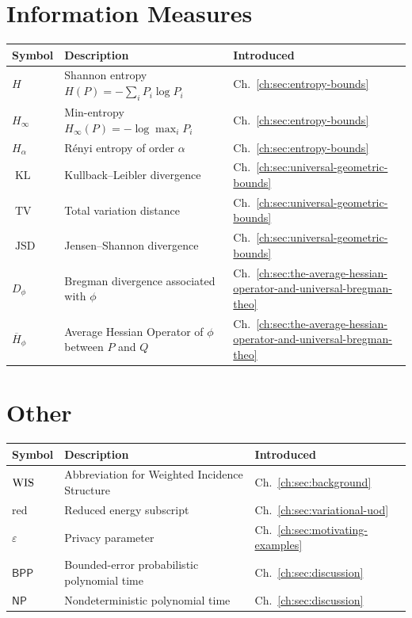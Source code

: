 \section*{Information Measures}

\begin{center}
\begin{tabular}{lll}
\hline
\textbf{Symbol} & \textbf{Description} & \textbf{Introduced} \\
\hline
  $H$ & Shannon entropy $H(P)=-\sum_i P_i\log P_i$ & Ch.~\ref{ch:sec:entropy-bounds} \\
  $H_\infty$ & Min-entropy $H_\infty(P)=-\log\max_i P_i$ & Ch.~\ref{ch:sec:entropy-bounds} \\
  $H_\alpha$ & R\'enyi entropy of order $\alpha$ & Ch.~\ref{ch:sec:entropy-bounds} \\
  $\operatorname{KL}$ & Kullback--Leibler divergence & Ch.~\ref{ch:sec:universal-geometric-bounds} \\
  $\operatorname{TV}$ & Total variation distance & Ch.~\ref{ch:sec:universal-geometric-bounds} \\
  $\operatorname{JSD}$ & Jensen--Shannon divergence & Ch.~\ref{ch:sec:universal-geometric-bounds} \\
  $D_\phi$ & Bregman divergence associated with $\phi$ & Ch.~\ref{ch:sec:the-average-hessian-operator-and-universal-bregman-theo} \\
  $\overline H_\phi$ & Average Hessian Operator of $\phi$ between $P$ and $Q$ & Ch.~\ref{ch:sec:the-average-hessian-operator-and-universal-bregman-theo} \\
\hline
\end{tabular}
\end{center}

\section*{Other}

\begin{center}
\begin{tabular}{lll}
\hline
\textbf{Symbol} & \textbf{Description} & \textbf{Introduced} \\
\hline
  $\mathrm{WIS}$ & Abbreviation for Weighted Incidence Structure & Ch.~\ref{ch:sec:background} \\
  $\mathrm{red}$ & Reduced energy subscript & Ch.~\ref{ch:sec:variational-uod} \\
  $\varepsilon$ & Privacy parameter & Ch.~\ref{ch:sec:motivating-examples} \\
  $\mathsf{BPP}$ & Bounded-error probabilistic polynomial time & Ch.~\ref{ch:sec:discussion} \\
  $\mathsf{NP}$ & Nondeterministic polynomial time & Ch.~\ref{ch:sec:discussion} \\
\hline
\end{tabular}
\end{center}